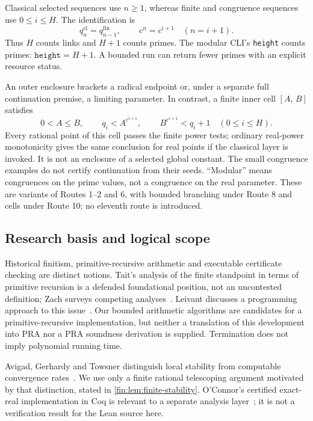 \documentclass[11pt,reqno]{amsart}
\theoremstyle{blueplain}
\providecommand{\comma}{\allowbreak,\,}
\numberwithin{equation}{section}
\def\hyperlink#1#2{#2}}
\begin{document}
Classical selected sequences use \(n\ge1\), whereas finite and congruence
sequences use \(0\le i\le H\). The identification is
\[
q^{\mathrm{cl}}_n=q^{\mathrm{fin}}_{n-1}\comma\qquad
c^n=c^{i+1}\quad(n=i+1).
\]
Thus \(H\) counts links and \(H+1\) counts primes. The modular \hyperlink{abbr:CLI}{CLI}'s
\texttt{height} counts primes: \(\texttt{height}=H+1\).
A bounded run can return fewer primes with an explicit resource status.

An outer enclosure brackets a radical endpoint or, under a separate full
continuation premise, a limiting parameter. In contrast, a finite inner
cell \([A\comma B]\) satisfies
\[
0<A\le B\comma\qquad q_i<A^{c^{i+1}}\comma\qquad
B^{c^{i+1}}<q_i+1\quad(0\le i\le H).
\]
Every rational point of this cell passes the finite power tests; ordinary
real-power monotonicity gives the same conclusion for real points if the
classical layer is invoked. It is not an enclosure of a selected global
constant. The small congruence examples do not certify continuation from
their seeds. ``Modular'' means congruences on the prime values, not a
congruence on the real parameter. These are variants of Routes 1--2 and 6,
with bounded branching under Route 8 and cells under Route 10; no eleventh
route is introduced.

\subsection{Research basis and logical scope}
\hypertarget{term:PRA}{}
Historical finitism, primitive-recursive arithmetic and executable
certificate checking are distinct notions. Tait's analysis of the finite
standpoint in terms of primitive recursion is a defended foundational
position, not an uncontested definition; Zach surveys competing
analyses~\cite{Zach2023,Tait1981,Tait2012}. Leivant discusses a programming
approach to this issue~\cite{Leivant2021}. Our bounded arithmetic algorithms
are candidates for a primitive-recursive implementation, but neither a
translation of this development into \hyperlink{abbr:PRA}{PRA} nor a \hyperlink{abbr:PRA}{PRA} soundness derivation is
supplied. Termination does not imply polynomial running time.

Avigad, Gerhardy and Towsner distinguish local stability from computable
convergence rates~\cite{AvigadGerhardyTowsner2010}. We use only a finite
rational telescoping argument motivated by that distinction, stated in
\cref{fin:lem:finite-stability}. O'Connor's certified exact-real implementation
in Coq is relevant to a separate analysis layer~\cite{OConnor2008}; it is
not a verification result for the Lean source here.
\end{document}
